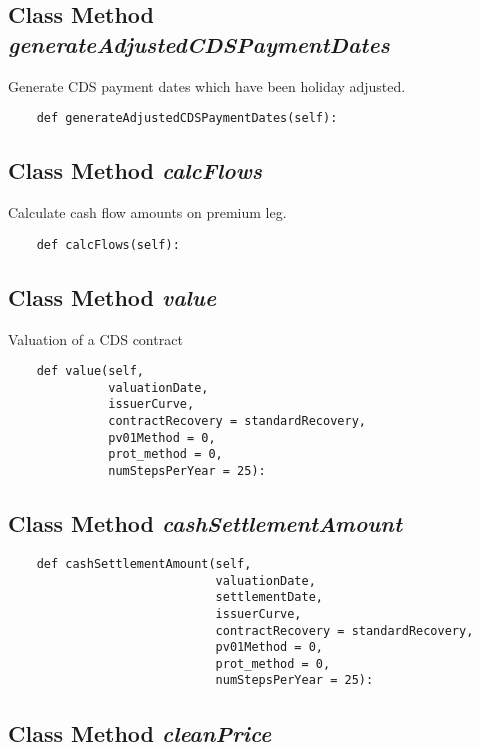 \documentclass[twoside,11pt]{book}
\begin{document}
\subsection{Class Method {\it generateAdjustedCDSPaymentDates}}
Generate CDS payment dates which have been holiday adjusted.

\begin{lstlisting}
    def generateAdjustedCDSPaymentDates(self):
\end{lstlisting}

\subsection{Class Method {\it calcFlows}}
Calculate cash flow amounts on premium leg. 

\begin{lstlisting}
    def calcFlows(self):
\end{lstlisting}

\subsection{Class Method {\it value}}
Valuation of a CDS contract 

\begin{lstlisting}
    def value(self,
              valuationDate,
              issuerCurve,
              contractRecovery = standardRecovery,
              pv01Method = 0,
              prot_method = 0,
              numStepsPerYear = 25):
\end{lstlisting}

\subsection{Class Method {\it cashSettlementAmount}}


\begin{lstlisting}
    def cashSettlementAmount(self,
                             valuationDate,
                             settlementDate,
                             issuerCurve,
                             contractRecovery = standardRecovery,
                             pv01Method = 0,
                             prot_method = 0,
                             numStepsPerYear = 25):
\end{lstlisting}

\subsection{Class Method {\it cleanPrice}}
\end{document}
